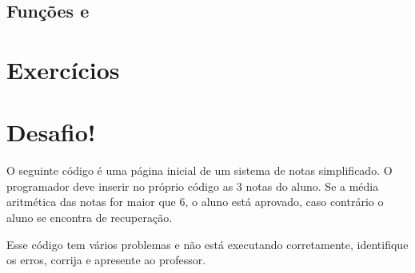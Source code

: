 
\subsection{Funções \funcaosort e \funcaorsort}


\section{Exercícios}
\label{cap6-exercicios}

\section{Desafio!}
\label{cap6-desafio}
O seguinte código é uma página inicial de um sistema de notas simplificado.
O programador deve inserir no próprio código as 3 notas do aluno. Se a média aritmética 
das notas for maior que 6, o aluno está aprovado, caso contrário o aluno se encontra de 
recuperação.

Esse código tem vários problemas e não está executando corretamente, identifique os erros, 
corrija e apresente ao professor.

